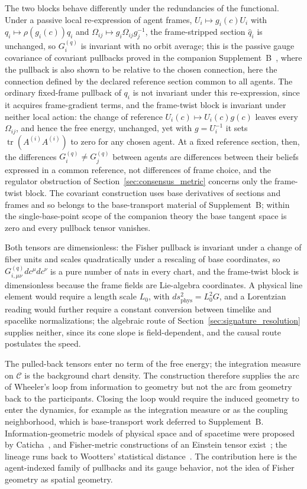 The two blocks behave differently under the redundancies of the functional. Under a passive local re-expression of agent frames, $U_i \mapsto g_i(c)U_i$ with $q_i \mapsto \rho(g_i(c))q_i$ and $\Omega_{ij} \mapsto g_i\Omega_{ij}g_j^{-1}$, the frame-stripped section $\hat{q}_i$ is unchanged, so $G^{(q)}_i$ is invariant with no orbit average; this is the passive gauge covariance of covariant pullbacks proved in the companion Supplement~B~\cite[Ch.~B2]{DennisGaugeVFESuppB2026}, where the pullback is also shown to be relative to the chosen connection, here the connection defined by the declared reference section common to all agents. The ordinary fixed-frame pullback of $q_i$ is not invariant under this re-expression, since it acquires frame-gradient terms, and the frame-twist block is invariant under neither local action: the change of reference $U_i(c) \mapsto U_i(c)g(c)$ leaves every $\Omega_{ij}$, and hence the free energy, unchanged, yet with $g = U_i^{-1}$ it sets $\operatorname{tr}(A^{(i)}A^{(i)})$ to zero for any chosen agent. At a fixed reference section, then, the differences $G^{(q)}_i \neq G^{(q)}_j$ between agents are differences between their beliefs expressed in a common reference, not differences of frame choice, and the regulator obstruction of Section~\ref{sec:consensus_metric} concerns only the frame-twist block. The covariant construction uses base derivatives of sections and frames and so belongs to the base-transport material of Supplement~B; within the single-base-point scope of the companion theory the base tangent space is zero and every pullback tensor vanishes.

Both tensors are dimensionless: the Fisher pullback is invariant under a change of fiber units and scales quadratically under a rescaling of base coordinates, so $G^{(q)}_{i,\mu\nu}dc^\mu dc^\nu$ is a pure number of nats in every chart, and the frame-twist block is dimensionless because the frame fields are Lie-algebra coordinates. A physical line element would require a length scale $L_0$, with $ds^2_{\text{phys}} = L_0^2 G$, and a Lorentzian reading would further require a constant conversion between timelike and spacelike normalizations; the algebraic route of Section~\ref{sec:signature_resolution} supplies neither, since its cone slope is field-dependent, and the causal route postulates the speed.

The pulled-back tensors enter no term of the free energy; the integration measure on $\mathcal{C}$ is the background chart density. The construction therefore supplies the arc of Wheeler's loop from information to geometry but not the arc from geometry back to the participants. Closing the loop would require the induced geometry to enter the dynamics, for example as the integration measure or as the coupling neighborhood, which is base-transport work deferred to Supplement~B. Information-geometric models of physical space and of spacetime were proposed by Caticha~\cite{Caticha2005, Caticha2019spacetime}, and Fisher-metric constructions of an Einstein tensor exist~\cite{Matsueda2013}; the lineage runs back to Wootters' statistical distance~\cite{Wootters1981}. The contribution here is the agent-indexed family of pullbacks and its gauge behavior, not the idea of Fisher geometry as spatial geometry.

